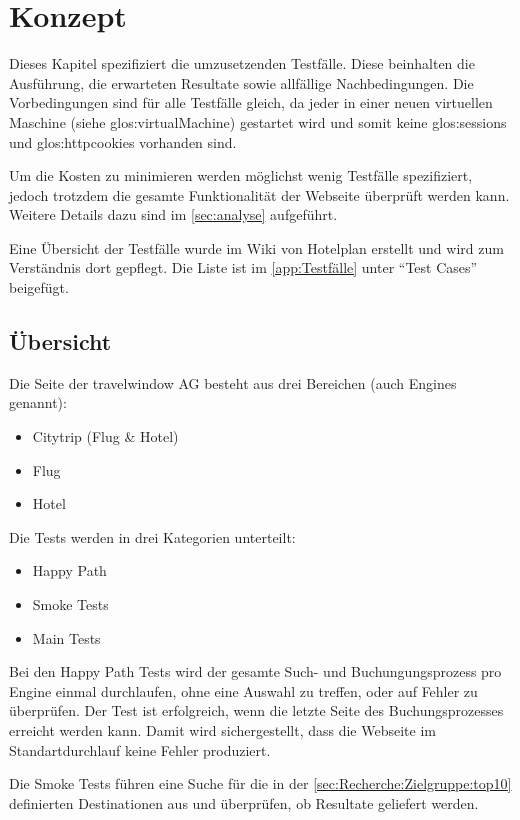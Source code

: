 
\chapter{Konzept}
\label{sec:konzept}
Dieses Kapitel spezifiziert die umzusetzenden Testfälle. Diese beinhalten die Ausführung, die erwarteten Resultate sowie allfällige Nachbedingungen. Die Vorbedingungen sind für alle Testfälle gleich, da jeder in einer neuen virtuellen Maschine (siehe \Gls{glos:virtualMachine}) gestartet wird und somit keine \Glspl{glos:session} und \Glspl{glos:httpcookie} vorhanden sind.

Um die Kosten zu minimieren werden möglichst wenig Testfälle spezifiziert, jedoch trotzdem die gesamte Funktionalität der Webseite überprüft werden kann. Weitere Details dazu sind im \cref{sec:analyse}  aufgeführt.

Eine Übersicht der Testfälle wurde im Wiki von Hotelplan erstellt und wird zum Verständnis dort gepflegt. Die Liste ist im \cref{app:Testfälle}  unter "`Test Cases"' beigefügt.

\section{Übersicht}
Die Seite der travelwindow AG besteht aus drei Bereichen (auch Engines genannt):
\begin{itemize}
\item Citytrip (Flug \& Hotel)
\item Flug
\item Hotel
\end{itemize}

Die Tests werden in drei Kategorien unterteilt:
\begin{itemize}
\item Happy Path
\item Smoke Tests
\item Main Tests
\end{itemize}

Bei den Happy Path Tests wird der gesamte Such- und Buchungungsprozess pro Engine einmal durchlaufen, ohne eine Auswahl zu treffen, oder auf Fehler zu überprüfen. Der Test ist erfolgreich, wenn die letzte Seite des Buchungsprozesses erreicht werden kann. Damit wird sichergestellt, dass die Webseite im Standartdurchlauf keine Fehler produziert.

Die Smoke Tests führen eine Suche für die in der \cref{sec:Recherche:Zielgruppe:top10}  definierten Destinationen aus und überprüfen, ob Resultate geliefert werden.

